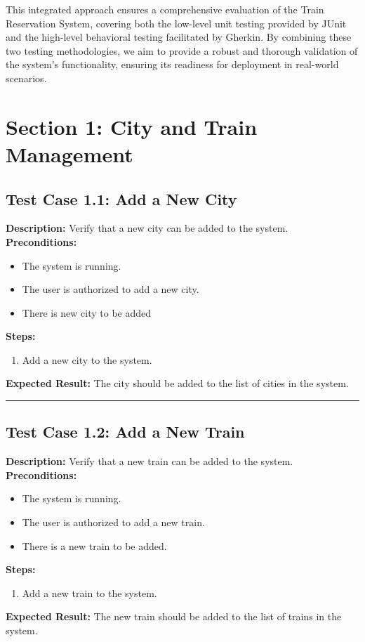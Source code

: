 \documentclass{article}
\begin{document}
This integrated approach ensures a comprehensive evaluation of the Train Reservation System, covering both the low-level unit testing provided by JUnit and the high-level behavioral testing facilitated by Gherkin. By combining these two testing methodologies, we aim to provide a robust and thorough validation of the system's functionality, ensuring its readiness for deployment in real-world scenarios.

\pagebreak

\section{Section 1: City and Train Management}
\bigskip
\bigskip
\subsection{Test Case 1.1: Add a New City}

\textbf{Description:} Verify that a new city can be added to the system.\\
\textbf{Preconditions:}
\begin{itemize}
  \item The system is running.
  \item The user is authorized to add a new city.
  \item There is new city to be added
\end{itemize}
\textbf{Steps:}
\begin{enumerate}
  \item Add a new city to the system.
\end{enumerate}
\textbf{Expected Result:} The city should be added to the list of cities in the system.

\bigskip
\hrule
\bigskip


\subsection{Test Case 1.2: Add a New Train}

\textbf{Description:} Verify that a new train can be added to the system.\\
\textbf{Preconditions:}
\begin{itemize}
  \item The system is running.
  \item The user is authorized to add a new train.
  \item There is a new train to be added.
\end{itemize}
\textbf{Steps:}
\begin{enumerate}
  \item Add a new train to the system.
\end{enumerate}
\textbf{Expected Result:} The new train should be added to the list of trains in the system.
\end{document}
